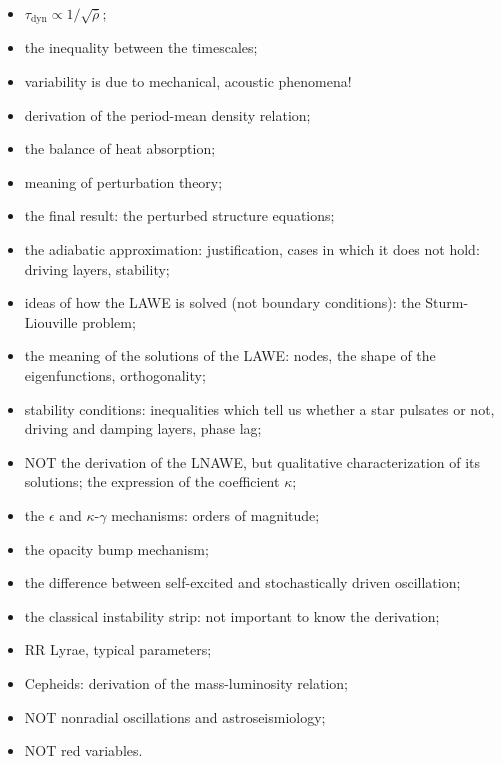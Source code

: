 \documentclass[main.tex]{subfiles}
\begin{document}
\begin{itemize}
    \item \(\tau _{\text{dyn}} \propto 1/\sqrt{\overline{\rho } } \);
    \item the inequality between the timescales;
    \item variability is due to mechanical, acoustic phenomena!
    \item derivation of the period-mean density relation;
    \item the balance of heat absorption;
    \item meaning of perturbation theory;
    \item the final result: the perturbed structure equations;
    \item the adiabatic approximation: justification, cases in which it does not hold: driving layers, stability;
    \item ideas of how the LAWE is solved (not boundary conditions): the Sturm-Liouville problem;
    \item the meaning of the solutions of the LAWE: nodes, the shape of the eigenfunctions, orthogonality;
    \item stability conditions: inequalities which tell us whether a star pulsates or not, driving and damping layers, phase lag;
    \item NOT the derivation of the LNAWE, but qualitative characterization of its solutions; the expression of the coefficient \(\kappa \);
    \item the \(\epsilon \) and \(\kappa \)-\(\gamma \) mechanisms: orders of magnitude;
    \item the opacity bump mechanism;
    \item the difference between self-excited and stochastically driven oscillation;
    \item the classical instability strip: not important to know the derivation;
    \item RR Lyrae, typical parameters;
    \item Cepheids: derivation of the mass-luminosity relation;
    \item NOT nonradial oscillations and astroseismiology;
    \item NOT red variables.
\end{itemize}
\end{document}

